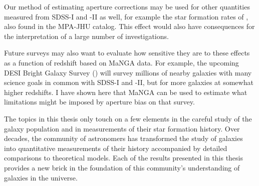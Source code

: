 Our method of estimating aperture corrections may be 
used for other quantities measured from SDSS-I and -II as
well, for example the star formation rates of \citet{brinchmann_physical_2004}, also found in the 
MPA-JHU catalog. This effect would also have
consequences for the interpretation of 
a large number of investigations.

Future surveys may also want to evaluate how sensitive 
they are to these effects as a function of redshift based
on MaNGA data. For example, the upcoming DESI Bright Galaxy
Survey (\citealt{desi16a}) will survey millions of nearby
galaxies with many science goals in common with 
SDSS-I and -II, but for more galaxies at somewhat
higher redshifts. I have shown here that MaNGA can be used
to estimate what limitations might be imposed by aperture bias 
on that survey. 

The topics in this thesis only touch on a few elements in 
the careful study of the galaxy population and in measurements
of their star formation history. 
Over decades, the community of astronomers has transformed
the study of galaxies into quantitative measurements
of their history accompanied by detailed comparisons to
theoretical models. Each of the results presented in this
thesis provides a new brick in the foundation of this 
community's understanding of galaxies in the universe.

